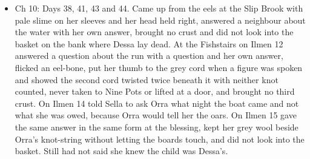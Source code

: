 \documentclass{design/chronicle}
\begin{document}
{\begin{itemize}[leftmargin=1.4em,itemsep=1pt,topsep=3pt,parsep=0pt]
\end{itemize}

\begin{itemize}[leftmargin=1.4em,itemsep=1pt,topsep=3pt,parsep=0pt]

\item Ch 10: Days 38, 41, 43 and 44. Came up from the eels at the Slip Brook with pale slime on her sleeves and her head held right, answered a neighbour about the water with her own answer, brought no crust and did not look into the basket on the bank where Dessa lay dead. At the Fishstairs on Ilmen 12 answered a question about the run with a question and her own answer, flicked an eel-bone, put her thumb to the grey cord when a figure was spoken and showed the second cord twisted twice beneath it with neither knot counted, never taken to Nine Pots or lifted at a door, and brought no third crust. On Ilmen 14 told Sella to ask Orra what night the boat came and not what she was owed, because Orra would tell her the oars. On Ilmen 15 gave the same answer in the same form at the blessing, kept her grey wool beside Orra’s knot-string without letting the boards touch, and did not look into the basket. Still had not said she knew the child was Dessa’s.

\end{itemize}
}
\end{document}
